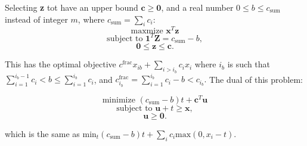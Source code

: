 \documentclass{article}
\begin{document}
Selecting \textbf{z} tot have an upper bound $\mathbf{c}\geq\mathbf{0}$, and a real number
$0\leq b \leq c_\text{sum}$ instead of integer $m$, where $c_\text{sum}=\sum_ic_i$:
$$\text{maxmize } \mathbf{x}^T\mathbf{z}$$
$$\text{subject to } \mathbf{1}^T\mathbf{Z} = c_\text{sum} - b,$$
$$\mathbf{0}\leq\mathbf{z}\leq\mathbf{c}.$$

This has the optimal objective $c^\text{frac}x_{ib} + \sum_{i>i_b}c_ix_i$ where $i_b$ is such that
$\sum_{i=1}^{i_b-1}c_i<b\leq\sum^{i_b}_{i=1}c_i$, and $c_{i_b}^\text{frac}=\sum^{i_b}_{i=1}c_i-b<c_{i_b}.$
The dual of this problem:

$$\text{minimize } (c_\text{sum}-b)t+\mathbf{c}^T\mathbf{u}$$
$$\text{subject to } \mathbf{u}+t\geq\mathbf{x},$$
$$\mathbf{u}\geq\mathbf{0}.$$

which is the same as $\text{min}_t(c_\text{sum}-b)t+\sum_ic_i\text{max}(0,x_i-t)$.
\end{document}
